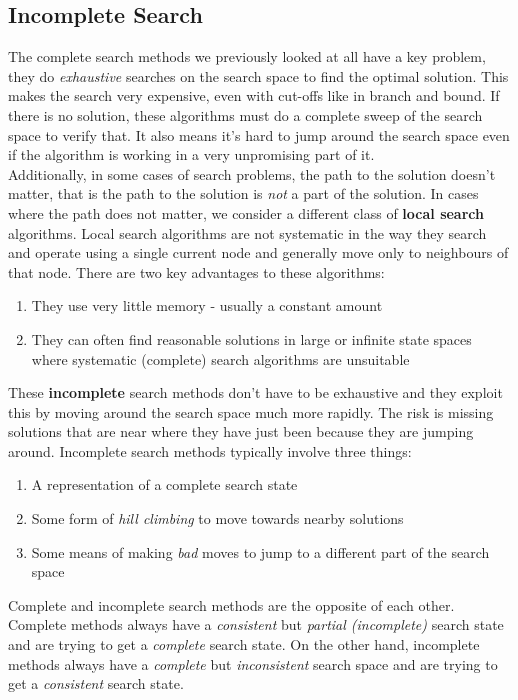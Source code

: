 \documentclass{article}
\newcommand{\n}[0]{\\[\baselineskip]}
\begin{document}
\subsection{Incomplete Search}
The complete search methods we previously looked at all have a key problem, they do \textit{exhaustive} searches on the search space to find the optimal solution. This makes the search very expensive, even with cut-offs like in branch and bound. If there is no solution, these algorithms must do a complete sweep of the search space to verify that. It also means it's hard to jump around the search space even if the algorithm is working in a very unpromising part of it. 
\n
Additionally, in some cases of search problems, the path to the solution doesn't matter, that is the path to the solution is \textit{not} a part of the solution. In cases where the path does not matter, we consider a different class of \textbf{local search} algorithms. Local search algorithms are not systematic in the way they search and operate using a single current node and generally move only to neighbours of that node. There are two key advantages to these algorithms:
\begin{enumerate}
\item They use very little memory - usually a constant amount
\item They can often find reasonable solutions in large or infinite state spaces where systematic (complete) search algorithms are unsuitable
\end{enumerate}
These \textbf{incomplete} search methods don't have to be exhaustive and they exploit this by moving around the search space much more rapidly. The risk is missing solutions that are near where they have just been because they are jumping around. Incomplete search methods typically involve three things:
\begin{enumerate}
\item A representation of a complete search state
\item Some form of \textit{hill climbing} to move towards nearby solutions
\item Some means of making \textit{bad} moves to jump to a different part of the search space
\end{enumerate}
Complete and incomplete search methods are the opposite of each other. Complete methods always have a \textit{consistent} but \textit{partial (incomplete)} search state and are trying to get a \textit{complete} search state. On the other hand, incomplete methods always have a \textit{complete} but \textit{inconsistent} search space and are trying to get a \textit{consistent} search state.
\end{document}
